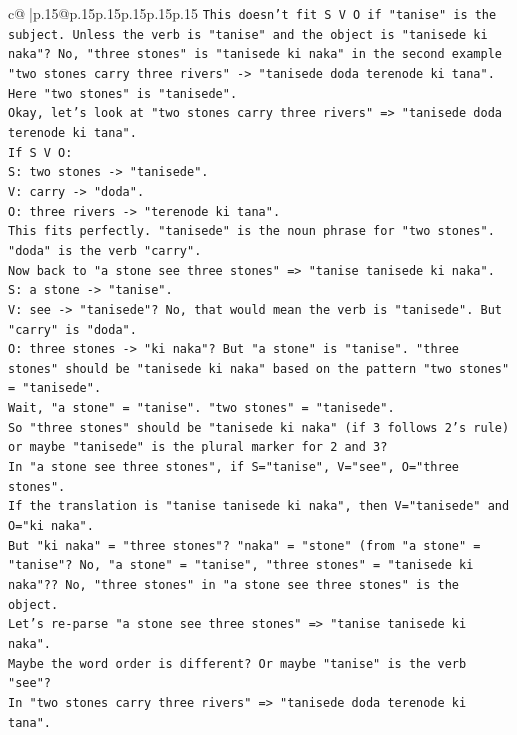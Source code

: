 \documentclass{article}
\begin{document}
{\begin{supertabular}{c@{$\;$}|p{.15\linewidth}@{}p{.15\linewidth}p{.15\linewidth}p{.15\linewidth}p{.15\linewidth}p{.15\linewidth}}
{{{\texttt{This doesn't fit S V O if "tanise" is the subject. Unless the verb is "tanise" and the object is "tanisede ki naka"? No, "three stones" is "tanisede ki naka" in the second example "two stones carry three rivers" {-}> "tanisede doda terenode ki tana". Here "two stones" is "tanisede".} \\
\texttt{Okay, let's look at "two stones carry three rivers" => "tanisede doda terenode ki tana".} \\
\texttt{If S V O:} \\
\texttt{S: two stones {-}> "tanisede".} \\
\texttt{V: carry {-}> "doda".} \\
\texttt{O: three rivers {-}> "terenode ki tana".} \\
\texttt{This fits perfectly. "tanisede" is the noun phrase for "two stones". "doda" is the verb "carry".} \\
\texttt{Now back to "a stone see three stones" => "tanise tanisede ki naka".} \\
\texttt{S: a stone {-}> "tanise".} \\
\texttt{V: see {-}> "tanisede"? No, that would mean the verb is "tanisede". But "carry" is "doda".} \\
\texttt{O: three stones {-}> "ki naka"? But "a stone" is "tanise". "three stones" should be "tanisede ki naka" based on the pattern "two stones" = "tanisede".} \\
\texttt{Wait, "a stone" = "tanise". "two stones" = "tanisede".} \\
\texttt{So "three stones" should be "tanisede ki naka" (if 3 follows 2's rule) or maybe "tanisede" is the plural marker for 2 and 3?} \\
\texttt{In "a stone see three stones", if S="tanise", V="see", O="three stones".} \\
\texttt{If the translation is "tanise tanisede ki naka", then V="tanisede" and O="ki naka".} \\
\texttt{But "ki naka" = "three stones"? "naka" = "stone" (from "a stone" = "tanise"? No, "a stone" = "tanise", "three stones" = "tanisede ki naka"?? No, "three stones" in "a stone see three stones" is the object.} \\
\texttt{Let's re{-}parse "a stone see three stones" => "tanise tanisede ki naka".} \\
\texttt{Maybe the word order is different? Or maybe "tanise" is the verb "see"?} \\
\texttt{In "two stones carry three rivers" => "tanisede doda terenode ki tana".} \\
}}}
\end{supertabular}}
\end{document}
